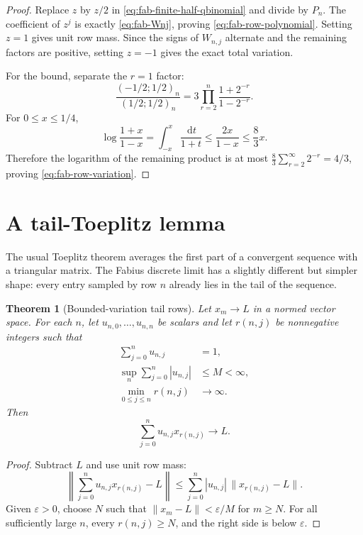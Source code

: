 \documentclass[11pt,oneside,openany]{book}
\newtheorem{theorem}{Theorem}[chapter]
\theoremstyle{definition}
\theoremstyle{remark}
\newcommand{\dd}{\,\mathrm d}
\begin{document}
\begin{proof}
Replace $z$ by $z/2$ in \eqref{eq:fab-finite-half-qbinomial} and divide by $P_n$.  The coefficient of $z^j$ is exactly \eqref{eq:fab-Wnj}, proving \eqref{eq:fab-row-polynomial}.  Setting $z=1$ gives unit row mass.  Since the signs of $W_{n,j}$ alternate and the remaining factors are positive, setting $z=-1$ gives the exact total variation.

For the bound, separate the $r=1$ factor:
\[
 \frac{(-1/2;1/2)_n}{(1/2;1/2)_n}
 =3\prod_{r=2}^n\frac{1+2^{-r}}{1-2^{-r}}.
\]
For $0\le x\le1/4$,
\[
 \log\frac{1+x}{1-x}
 =\int_{-x}^x\frac{\dd t}{1+t}
 \le\frac{2x}{1-x}\le\frac83x.
\]
Therefore the logarithm of the remaining product is at most
\(
 \frac83\sum_{r=2}^{\infty}2^{-r}=4/3
\), proving \eqref{eq:fab-row-variation}.
\end{proof}

\section{A tail-Toeplitz lemma}

The usual Toeplitz theorem averages the first part of a convergent sequence with a triangular matrix.  The Fabius discrete limit has a slightly different but simpler shape: every entry sampled by row $n$ already lies in the tail of the sequence.

\begin{theorem}[Bounded-variation tail rows]\label{thm:fab-tail-toeplitz}
Let $x_m\to L$ in a normed vector space.  For each $n$, let $u_{n,0},\ldots,u_{n,n}$ be scalars and let $r(n,j)$ be nonnegative integers such that
\begin{align*}
 \sum_{j=0}^nu_{n,j}&=1,\\
 \sup_n\sum_{j=0}^n|u_{n,j}|&\le M<\infty,\\
 \min_{0\le j\le n}r(n,j)&\longrightarrow\infty.
\end{align*}
Then
\[
 \sum_{j=0}^nu_{n,j}x_{r(n,j)}\longrightarrow L.
\]
\end{theorem}

\begin{proof}
Subtract $L$ and use unit row mass:
\[
 \left\|\sum_{j=0}^nu_{n,j}x_{r(n,j)}-L\right\|
 \le\sum_{j=0}^n|u_{n,j}|\,
       \|x_{r(n,j)}-L\|.
\]
Given $\varepsilon>0$, choose $N$ such that $\|x_m-L\|<\varepsilon/M$ for $m\ge N$.  For all sufficiently large $n$, every $r(n,j)\ge N$, and the right side is below $\varepsilon$.
\end{proof}
\end{document}
